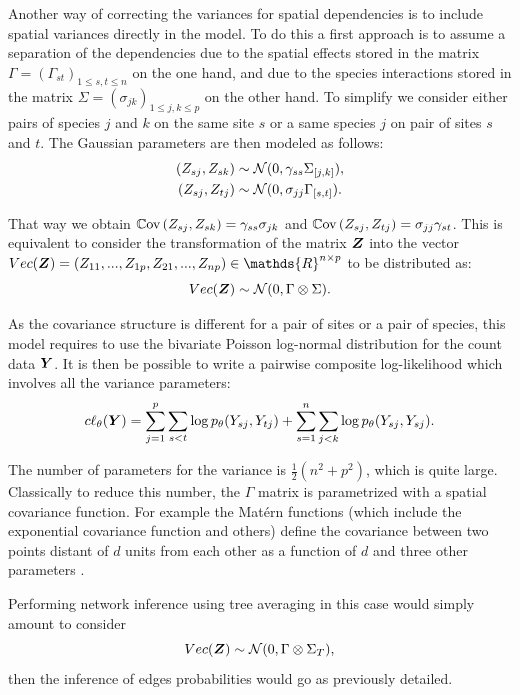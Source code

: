 
Another way of correcting the variances for spatial dependencies is to include spatial variances directly in the model. To do this a first approach is to assume a separation of the dependencies due to the spatial effects stored in the matrix $\Gamma=(\Gamma_{st})_{1\leq s,t\leq n}$ on the one hand, and due to the species interactions stored in the matrix $\Sigma=(\sigma_{jk})_{1\leq j,k\leq p}$ on the other hand. To simplify we consider either pairs of species $j$ and $k$ on the same site $s$ or a same species $j$ on pair of sites $s$ and $t$. The Gaussian parameters are then modeled as follows:
\begin{align*}
(Z_{sj},Z_{sk}) &\sim \mathcal{N}(0, \gamma_{ss} \Sigma_{[j,k]}),\\
(Z_{sj},Z_{tj}) &\sim \mathcal{N}(0, \sigma_{jj} \Gamma_{[s,t]}).
\end{align*}

That way we obtain $\operatorname*{\mathbb{C}\text{ov}}{(Z_{sj},Z_{sk})} = \gamma_{ss} \sigma_{jk}$ and $\operatorname*{\mathbb{C}\text{ov}}{(Z_{sj},Z_{tj})} =  \sigma_{jj}\gamma_{st}$. This is equivalent to consider the transformation of the matrix ${\boldsymbol{Z}}$ into the vector $Vec(\Zbf) = (Z_{11},..., Z_{1p},Z_{21},...,Z_{np}) \in \mathds{R}^{n\times p}$ to be distributed as:
$$Vec({\boldsymbol{Z}}) \sim \mathcal{N}(0,\Gamma \otimes \Sigma).$$ 

As the covariance structure is different for a pair of sites or a pair of species, this model requires to use the bivariate Poisson log-normal distribution for the count data ${\boldsymbol{Y}}$.
It is then be possible to write a pairwise composite log-likelihood which involves all the variance parameters:
$$c\ell_\theta({\boldsymbol{Y}}) = \sum_{j=1}^p \sum_{s<t} \log p_\theta(Y_{sj}, Y_{tj})+\sum_{s=1}^n \sum_{j<k} \log p_\theta(Y_{sj}, Y_{sj}).$$

The number of parameters for the variance is $\frac{1}{2}(n^2+ p^2)$, which is quite large. Classically to reduce this number, the $\Gamma$ matrix is parametrized with a spatial covariance function.  For example the Matérn functions (which include the exponential covariance function and others) define the covariance between two points distant of $d$ units from each other as a function of $d$ and three other parameters \citep{CW15}.

Performing network inference using tree averaging in this case would simply amount to consider 
$$Vec({\boldsymbol{Z}}) \sim \mathcal{N}(0,\Gamma \otimes \Sigma_T),$$
then the inference of edges probabilities would go as previously detailed.
 
